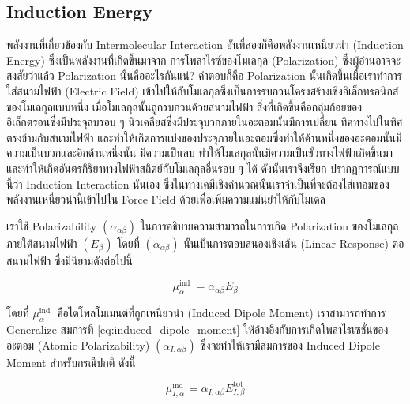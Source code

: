 \subsection{Induction Energy}

พลังงานที่เกี่ยวข้องกับ Intermolecular Interaction อันที่สองก็คือพลังงานเหนี่ยวนำ (Induction Energy) ซึ่งเป็นพลังงานที่เกิดขึ้นมาจาก%
การโพลาไรซ์ของโมเลกุล (Polarization) ซึ่งผู้อ่านอาจจะสงสัยว่าแล้ว Polarization นั้นคืออะไรกันแน่? คำตอบก็คือ Polarization
นั้นเกิดขึ้นเมื่อเราทำการใส่สนามไฟฟ้า (Electric Field) เข้าไปให้กับโมเลกุลซึ่งเป็นการรบกวนโครงสร้างเชิงอิเล็กทรอนิกส์ของโมเลกุลแบบหนึ่ง
เมื่อโมเลกุลนั้นถูกรบกวนด้วยสนามไฟฟ้า สิ่งที่เกิดขึ้นคือกลุ่มก้อยของอิเล็กตรอนซึ่งมีประจุลบรอบ ๆ นิวเคลียสซึ่งมีประจุบวกภายในอะตอมนั้นมีการเปลี่ยน%
ทิศทางไปในทิศตรงข้ามกับสนามไฟฟ้า และทำให้เกิดการแบ่งของประจุภายในอะตอมซึ่งทำให้ด้านหนึ่งของอะตอมนั้นมีความเป็นบวกและอีกด้านหนึ่งนั้น%
มีความเป็นลบ ทำให้โมเลกุลนั้นมีความเป็นขั้วทางไฟฟ้าเกิดขึ้นมาและทำให้เกิดอันตรกิริยาทางไฟฟ้าสถิตย์กับโมเลกุลอื่นรอบ ๆ ได้ ดังนั้นเราจึงเรียก%
ปรากฏการณ์แบบนี้ว่า Induction Interaction นั่นเอง ซึ่งในทางเคมีเชิงคำนวณนั้นเราจำเป็นที่จะต้องใส่เทอมของพลังงานเหนี่ยวนำนี้เข้าไปใน
Force Field ด้วยเพื่อเพิ่มความแม่นยำให้กับโมเดล

เราใช้ Polarizability $(\alpha_{\alpha \beta})$ ในการอธิบายความสามารถในการเกิด Polarization ของโมเลกุลภายใต้สนามไฟฟ้า
$(E_{\beta})$ โดยที่ $(\alpha_{\alpha \beta})$ นั้นเป็นการตอบสนองเชิงเส้น (Linear Response) ต่อสนามไฟฟ้า ซึ่งมีนิยามดังต่อไปนี้

\begin{equation}
  \label{eq:induced_dipole_moment}
  \mu_\alpha^{\text{ind }}
  =
  \alpha_{\alpha \beta} E_\beta
\end{equation}

\noindent โดยที่ $\mu_\alpha^{\text{ind }}$ คือไดโพลโมเมนต์ที่ถูกเหนี่ยวนำ (Induced Dipole Moment) เราสามารถทำการ
Generalize สมการที่ \eqref{eq:induced_dipole_moment} ให้อ้างอิงกับการเกิดโพลาไรเซชั่นของอะตอม (Atomic Polarizability)
$(\alpha_{I, \alpha \beta})$ ซึ่งจะทำให้เรามีสมการของ Induced Dipole Moment สำหรับกรณีปกติ ดังนี้

\begin{equation}
  \mu_{I, \alpha}^{\text{ind }}
  =
  \alpha_{I, \alpha \beta} E_{I, \beta}^{\mathrm{tot}}
\end{equation}

